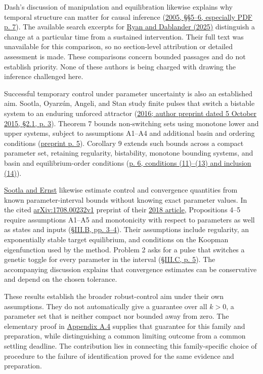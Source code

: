 Dash’s discussion of manipulation and equilibration likewise explains why temporal structure can matter for causal inference (\hyperlink{ref:dash2005}{2005, §§5–6, especially PDF p. 7}). The available search excerpts for \hyperlink{ref:ryan2025}{Ryan and Dablander (2025)} distinguish a change at a particular time from a sustained intervention. Their full text was unavailable for this comparison, so no section-level attribution or detailed assessment is made. These comparisons concern bounded passages and do not establish priority. None of these authors is being charged with drawing the inference challenged here.

Successful temporary control under parameter uncertainty is also an established aim. Sootla, Oyarzún, Angeli, and Stan study finite pulses that switch a bistable system to an enduring unforced attractor (\hyperlink{ref:sootla2016}{2016; author preprint dated 5 October 2015, §2.1, p. 3}). Theorem 7 bounds non-switching sets using monotone lower and upper systems, subject to assumptions A1–A4 and additional basin and ordering conditions (\hyperlink{ref:sootla2016}{preprint p. 5}). Corollary 9 extends such bounds across a compact parameter set, retaining regularity, bistability, monotone bounding systems, and basin and equilibrium-order conditions (\hyperlink{ref:sootla2016}{p. 6, conditions (11)–(13) and inclusion (14)}).

\hyperlink{ref:sootla2018}{Sootla and Ernst} likewise estimate control and convergence quantities from known parameter-interval bounds without knowing exact parameter values. In the cited \hyperlink{ref:sootla2018}{arXiv:\allowbreak{}1708.00232v1} preprint of their \hyperlink{ref:sootla2018}{2018 article}, Propositions 4–5 require assumptions A1–A5 and monotonicity with respect to parameters as well as states and inputs (\hyperlink{ref:sootla2018}{§III.B, pp. 3–4}). Their assumptions include regularity, an exponentially stable target equilibrium, and conditions on the Koopman eigenfunction used by the method. Problem 2 asks for a pulse that switches a genetic toggle for every parameter in the interval (\hyperlink{ref:sootla2018}{§III.C, p. 5}). The accompanying discussion explains that convergence estimates can be conservative and depend on the chosen tolerance.

These results establish the broader robust-control aim under their own assumptions. They do not automatically give a guarantee over all \(k>0\), a parameter set that is neither compact nor bounded away from zero. The elementary proof in \hyperref[app:a.4]{Appendix A.4} supplies that guarantee for this family and preparation, while distinguishing a common limiting outcome from a common settling deadline. The contribution lies in connecting this family-specific choice of procedure to the failure of identification proved for the same evidence and preparation.

